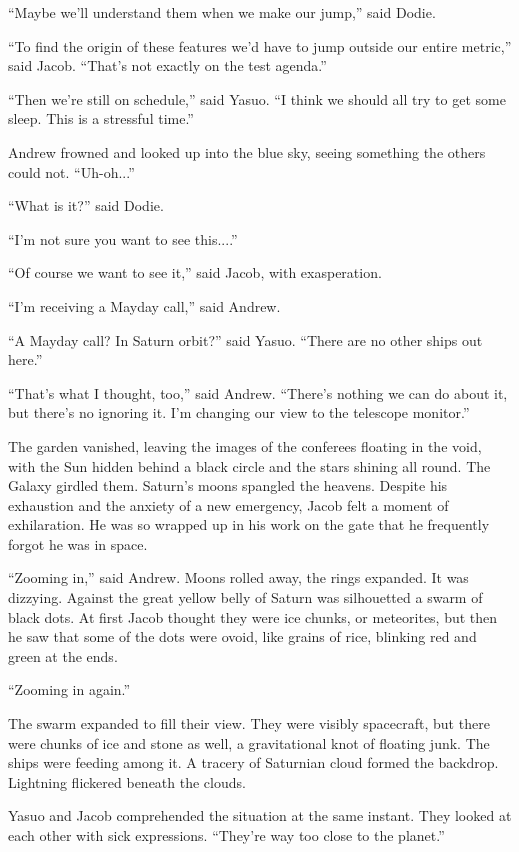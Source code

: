 \documentclass[english,11pt,letterpaper,onecolumn]{scrbook}
\begin{document}
	``Maybe we'll understand them when we make our jump,'' said Dodie.

	``To find the origin of these features we'd have to jump outside our entire metric,'' said Jacob.  ``That's not exactly on the test agenda.''

	``Then we're still on schedule,'' said Yasuo.  ``I think we should all try to get some sleep.  This is a stressful time.''

	Andrew frowned and looked up into the blue sky, seeing something the others could not.  ``Uh-oh...''

	``What is it?'' said Dodie.

	``I'm not sure you want to see this....''

	``Of course we want to see it,'' said Jacob, with exasperation.

	``I'm receiving a Mayday call,'' said Andrew.

	``A Mayday call?  In Saturn orbit?'' said Yasuo.  ``There are no other ships out here.''

	``That's what I thought, too,'' said Andrew.  ``There's nothing we can do about it, but there's no ignoring it.  I'm changing our view to the telescope monitor.''

	The garden vanished, leaving the images of the conferees floating in the void, with the Sun hidden behind a black circle and the stars shining all round.  The Galaxy girdled them.  Saturn's moons spangled the heavens.  Despite his exhaustion and the anxiety of a new emergency, Jacob felt a moment of exhilaration.  He was so wrapped up in his work on the gate that he frequently forgot he was in space.

	``Zooming in,'' said Andrew.  Moons rolled away, the rings expanded.  It was dizzying.  Against the great yellow belly of Saturn was silhouetted a swarm of black dots.  At first Jacob thought they were ice chunks, or meteorites, but then he saw that some of the dots were ovoid, like grains of rice, blinking red and green at the ends.

	``Zooming in again.''

	The swarm expanded to fill their view.  They were visibly spacecraft, but there were chunks of ice and stone as well, a gravitational knot of floating junk.  The ships were feeding among it.  A tracery of Saturnian cloud formed the backdrop.  Lightning flickered beneath the clouds.  

	Yasuo and Jacob comprehended the situation at the same instant.  They looked at each other with sick expressions.  ``They're way too close to the planet.''
\end{document}
